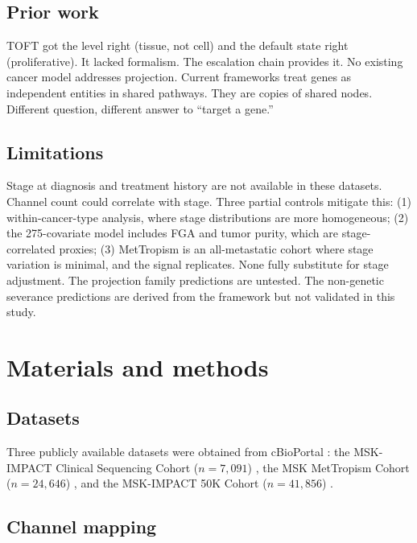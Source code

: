 \documentclass[11pt]{article}
\begin{document}
\subsection*{Prior work}

TOFT \cite{Sonnenschein2000} got the level right (tissue, not cell)
and the default state right (proliferative). It lacked formalism.
The escalation chain provides it. No existing cancer model addresses
projection. Current frameworks treat genes as independent entities
in shared pathways. They are copies of shared nodes. Different
question, different answer to ``target a gene.''

\subsection*{Limitations}

Stage at diagnosis and treatment history are not available in these
datasets. Channel count could correlate with stage. Three partial
controls mitigate this: (1) within-cancer-type analysis, where stage
distributions are more homogeneous; (2) the 275-covariate model
includes FGA and tumor purity, which are stage-correlated proxies;
(3) MetTropism is an all-metastatic cohort where stage variation is
minimal, and the signal replicates. None fully substitute for stage
adjustment. The projection family predictions are untested. The
non-genetic severance predictions are derived from the framework but
not validated in this study.


\section*{Materials and methods}

\subsection*{Datasets}

Three publicly available datasets were obtained from cBioPortal
\cite{Cerami2012}: the MSK-IMPACT Clinical Sequencing Cohort
($n = 7{,}091$) \cite{Zehir2017}, the MSK MetTropism Cohort
($n = 24{,}646$) \cite{Nguyen2022}, and the MSK-IMPACT 50K Cohort
($n = 41{,}856$) \cite{Bandlamudi2024}.

\subsection*{Channel mapping}
\end{document}
